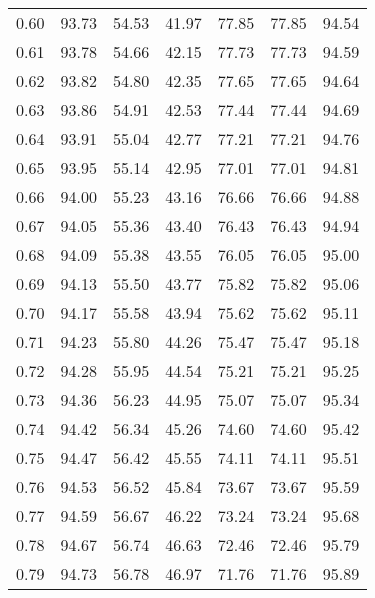 \begin{tabular}{|c|c|c|c|c|c|c|}
      0.60 &     93.73 &     54.53 &      41.97 &   77.85 &      77.85 &         94.54 \\
      0.61 &     93.78 &     54.66 &      42.15 &   77.73 &      77.73 &         94.59 \\
      0.62 &     93.82 &     54.80 &      42.35 &   77.65 &      77.65 &         94.64 \\
      0.63 &     93.86 &     54.91 &      42.53 &   77.44 &      77.44 &         94.69 \\
      0.64 &     93.91 &     55.04 &      42.77 &   77.21 &      77.21 &         94.76 \\
      0.65 &     93.95 &     55.14 &      42.95 &   77.01 &      77.01 &         94.81 \\
      0.66 &     94.00 &     55.23 &      43.16 &   76.66 &      76.66 &         94.88 \\
      0.67 &     94.05 &     55.36 &      43.40 &   76.43 &      76.43 &         94.94 \\
      0.68 &     94.09 &     55.38 &      43.55 &   76.05 &      76.05 &         95.00 \\
      0.69 &     94.13 &     55.50 &      43.77 &   75.82 &      75.82 &         95.06 \\
      0.70 &     94.17 &     55.58 &      43.94 &   75.62 &      75.62 &         95.11 \\
      0.71 &     94.23 &     55.80 &      44.26 &   75.47 &      75.47 &         95.18 \\
      0.72 &     94.28 &     55.95 &      44.54 &   75.21 &      75.21 &         95.25 \\
      0.73 &     94.36 &     56.23 &      44.95 &   75.07 &      75.07 &         95.34 \\
      0.74 &     94.42 &     56.34 &      45.26 &   74.60 &      74.60 &         95.42 \\
      0.75 &     94.47 &     56.42 &      45.55 &   74.11 &      74.11 &         95.51 \\
      0.76 &     94.53 &     56.52 &      45.84 &   73.67 &      73.67 &         95.59 \\
      0.77 &     94.59 &     56.67 &      46.22 &   73.24 &      73.24 &         95.68 \\
      0.78 &     94.67 &     56.74 &      46.63 &   72.46 &      72.46 &         95.79 \\
      0.79 &     94.73 &     56.78 &      46.97 &   71.76 &      71.76 &         95.89 \\

\end{tabular}
